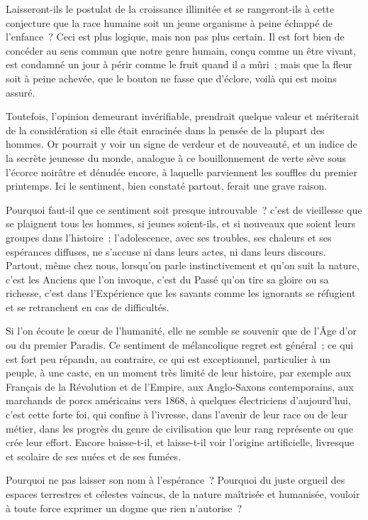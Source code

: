\documentclass[french,twoside]{book} %
\newcommand\chapterclose{} %
\begin{document}
\noindent Laisseront-ils le postulat de la croissance illimitée et se rangeront-ils à cette conjecture que la race humaine soit un jeune organisme à peine échappé de l’enfance ? Ceci est plus logique, mais non pas plus certain. Il est fort bien de concéder au sens commun que notre genre humain, conçu comme un être vivant, est condamné un jour à périr comme le fruit quand il a mûri ; mais que la fleur soit à peine achevée, que le bouton ne fasse que d’éclore, voilà qui est moins assuré.\par
Toutefois, l’opinion demeurant invérifiable, prendrait quelque valeur et mériterait de la considération si elle était enracinée dans la pensée de la plupart des hommes. Or pourrait y voir un signe de verdeur et de nouveauté, et un indice de la secrète jeunesse du monde, analogue à ce bouillonnement de verte sève sous l’écorce noirâtre et dénudée encore, à laquelle parviennent les souffles du premier printemps. Ici le sentiment, bien constaté partout, ferait une grave raison.\par
Pourquoi faut-il que ce sentiment soit presque introuvable ? c’est de vieillesse que se plaignent tous les hommes, si jeunes soient-ils, et si nouveaux que soient leurs groupes dans l’histoire ; l’adolescence, avec ses troubles, ses chaleurs et ses espérances diffuses, ne s’accuse ni dans leurs actes, ni dans leurs discours. Partout, même chez nous, lorsqu’on parle instinctivement et qu’on suit la nature, c’est les Anciens que l’on invoque, c’est du Passé qu’on tire sa gloire ou sa richesse, c’est dans l’Expérience que les savants comme les ignorants se réfugient et se retranchent en cas de difficultés.\par
Si l’on écoute le cœur de l’humanité, elle ne semble se souvenir que de l’Âge d’or ou du premier Paradis. Ce sentiment de mélancolique regret est général ; ce qui est fort peu répandu, au contraire, ce qui est exceptionnel, particulier à un peuple, à une caste, en un moment très limité de leur histoire, par exemple aux Français de la Révolution et de l’Empire, aux Anglo-Saxons contemporains, aux marchands de porcs américains vers 1868, à quelques électriciens d’aujourd’hui, c’est cette forte foi, qui confine à l’ivresse, dans l’avenir de leur race ou de leur métier, dans les progrès du genre de civilisation que leur rang représente ou que crée leur effort. Encore baisse-t-il, et laisse-t-il voir l’origine artificielle, livresque et scolaire de ses nuées et de ses fumées.\par
Pourquoi ne pas laisser son nom à l’espérance ? Pourquoi du juste orgueil des espaces terrestres et célestes vaincus, de la nature maîtrisée et humanisée, vouloir à toute force exprimer un dogme que rien n’autorise ?
\chapterclose
\end{document}
